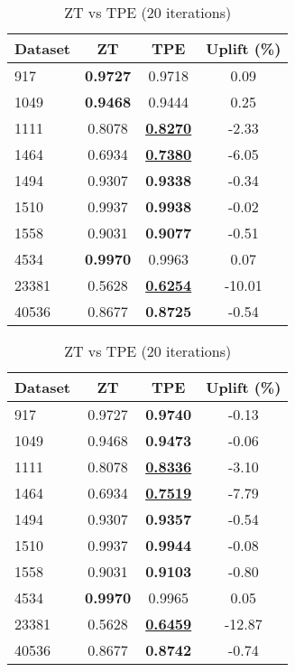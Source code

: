 \begin{table}[htbp]
\begin{center}
\begin{small}
\begin{sc}
\begin{subtable}[t]{0.48\textwidth}
    \centering
    \caption{ZT vs TPE (10 iterations)}
    \label{tab:xgboost-zt-vs-tpe-10}
    \begin{tabular}{lccc}
    \toprule
    \textbf{Dataset} & \textbf{ZT} & \textbf{TPE} & \textbf{Uplift (\%)} \\
    \midrule
    917    & \textbf{0.9727} & 0.9718 & 0.09 \\
    1049    & \textbf{0.9468} & 0.9444 & 0.25 \\
    1111    & 0.8078 & \underline{\textbf{0.8270}} & -2.33 \\
    1464    & 0.6934 & \underline{\textbf{0.7380}} & -6.05 \\
    1494    & 0.9307 & \textbf{0.9338} & -0.34 \\
    1510    & 0.9937 & \textbf{0.9938} & -0.02 \\
    1558    & 0.9031 & \textbf{0.9077} & -0.51 \\
    4534    & \textbf{0.9970} & 0.9963 & 0.07 \\
    23381    & 0.5628 & \underline{\textbf{0.6254}} & -10.01 \\
    40536    & 0.8677 & \textbf{0.8725} & -0.54 \\
    \bottomrule
    \end{tabular}
\end{subtable}
\hfill
\begin{subtable}[t]{0.48\textwidth}
    \centering
    \caption{ZT vs TPE (20 iterations)}
    \label{tab:xgboost-zt-vs-tpe-20}
    \begin{tabular}{lccc}
    \toprule
    \textbf{Dataset} & \textbf{ZT} & \textbf{TPE} & \textbf{Uplift (\%)} \\
    \midrule
    917    & 0.9727 & \textbf{0.9740} & -0.13 \\
    1049    & 0.9468 & \textbf{0.9473} & -0.06 \\
    1111    & 0.8078 & \underline{\textbf{0.8336}} & -3.10 \\
    1464    & 0.6934 & \underline{\textbf{0.7519}} & -7.79 \\
    1494    & 0.9307 & \textbf{0.9357} & -0.54 \\
    1510    & 0.9937 & \textbf{0.9944} & -0.08 \\
    1558    & 0.9031 & \textbf{0.9103} & -0.80 \\
    4534    & \textbf{0.9970} & 0.9965 & 0.05 \\
    23381    & 0.5628 & \underline{\textbf{0.6459}} & -12.87 \\
    40536    & 0.8677 & \textbf{0.8742} & -0.74 \\
    \bottomrule
    \end{tabular}
\end{subtable}

\end{sc}
\end{small}
\end{center}
\vskip -0.1in
\end{table}